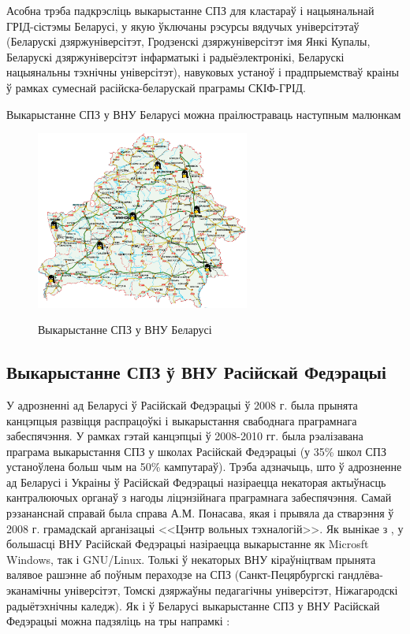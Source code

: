 \documentclass[10pt, a5paper]{article}
\begin{document}
Асобна трэба падкрэсліць выкарыстанне СПЗ для кластараў і нацыянальнай
ГРІД-сістэмы Беларусі, у якую ўключаны рэсурсы вядучых універсітэтаў (Беларускі
дзяржуніверсітэт, Гродзенскі дзяржуніверсітэт імя Янкі Купалы, Беларускі
дзяржуніверсітэт інфарматыкі і радыёэлектронікі, Беларускі нацыянальны
тэхнічны універсітэт), навуковых устаноў і прадпрыемстваў краіны ў рамках
сумеснай расійска-беларускай праграмы СКІФ-ГРІД.

Выкарыстанне СПЗ у ВНУ Беларусі можна праілюстраваць наступным малюнкам

\begin{figure}[htpb]
  \centering
  \includegraphics[width=7cm]{03_2012_bilorus}
  \label{fig:Zlobin1}
  \caption{Выкарыстанне СПЗ у ВНУ Беларусі}
\end{figure}


\subsection*{Выкарыстанне СПЗ ў ВНУ Расійскай Федэрацыі}

У адрозненні ад Беларусі ў Расійскай Федэрацыі ў 2008 г. была прынята канцэпцыя
развіцця распрацоўкі і выкарыстання свабоднага праграмнага забеспячэння. У
рамках гэтай канцэпцыі ў 2008-2010 гг. была рэалізавана праграма выкарыстання
СПЗ у школах Расійскай Федэрацыі (у 35\% школ СПЗ устаноўлена больш чым на
50\% кампутараў). Трэба адзначыць, што ў адрозненне ад Беларусі і Украіны ў
Расійскай Федэрацыі назіраецца некаторая актыўнасць кантралюючых органаў з
нагоды ліцэнзійнага праграмнага забеспячэння. Самай рэзананснай справай была
справа А.М. Понасава, якая і прывяла да стварэння ў 2008 г. грамадскай арганізацыі
<<Цэнтр вольных тэхналогій>>. Як вынікае з  \cite{Zlobin1, Zlobin2, Zlobin3}, у большасці ВНУ
Расійскай Федэрацыі назіраецца выкарыстанне як Microsft Windows, так і GNU/Linux. Толькі
ў некаторых ВНУ кіраўніцтвам прынята валявое рашэнне аб поўным пераходзе на
СПЗ (Санкт-Пецярбургскі гандлёва-эканамічны універсітэт, Томскі дзяржаўны
педагагічны універсітэт, Ніжагародскі радыётэхнічны каледж). Як і ў Беларусі
выкарыстанне СПЗ у ВНУ Расійскай Федэрацыі можна падзяліць на тры напрамкі
\cite{Zlobin3, Zlobin4, Zlobin5}:
\end{document}
